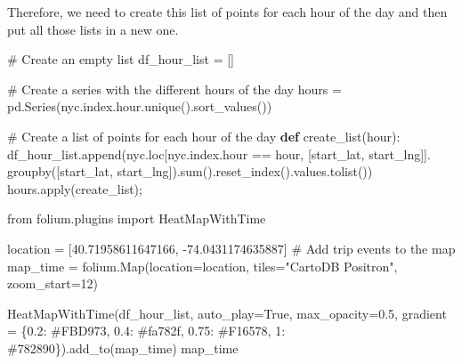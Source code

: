 \documentclass[
  letterpaper,
  DIV=11,
  numbers=noendperiod]{scrreprt}
\newenvironment{Shaded}{\begin{snugshade}}{\end{snugshade}}
\newcommand{\BuiltInTok}[1]{\textcolor[rgb]{0.00,0.23,0.31}{#1}}
\newcommand{\CommentTok}[1]{\textcolor[rgb]{0.37,0.37,0.37}{#1}}
\newcommand{\DecValTok}[1]{\textcolor[rgb]{0.68,0.00,0.00}{#1}}
\newcommand{\FloatTok}[1]{\textcolor[rgb]{0.68,0.00,0.00}{#1}}
\newcommand{\ImportTok}[1]{\textcolor[rgb]{0.00,0.46,0.62}{#1}}
\newcommand{\KeywordTok}[1]{\textcolor[rgb]{0.00,0.23,0.31}{\textbf{#1}}}
\newcommand{\NormalTok}[1]{\textcolor[rgb]{0.00,0.23,0.31}{#1}}
\newcommand{\OperatorTok}[1]{\textcolor[rgb]{0.37,0.37,0.37}{#1}}
\newcommand{\StringTok}[1]{\textcolor[rgb]{0.13,0.47,0.30}{#1}}
\newcommand{\VariableTok}[1]{\textcolor[rgb]{0.07,0.07,0.07}{#1}}
\begin{document}
Therefore, we need to create this list of points for each hour of the
day and then put all those lists in a new one.

\begin{Shaded}
\begin{Highlighting}[]
\CommentTok{\# Create an empty list}
\NormalTok{df\_hour\_list }\OperatorTok{=}\NormalTok{ []}

\CommentTok{\# Create a series with the different hours of the day}
\NormalTok{hours }\OperatorTok{=}\NormalTok{ pd.Series(nyc.index.hour.unique().sort\_values())}

\CommentTok{\# Create a list of points for each hour of the day}
\KeywordTok{def}\NormalTok{ create\_list(hour):}
\NormalTok{    df\_hour\_list.append(nyc.loc[nyc.index.hour }\OperatorTok{==}\NormalTok{ hour,}
\NormalTok{                                [}\StringTok{\textquotesingle{}start\_lat\textquotesingle{}}\NormalTok{,}
                                 \StringTok{\textquotesingle{}start\_lng\textquotesingle{}}\NormalTok{]].}
\NormalTok{                        groupby([}\StringTok{\textquotesingle{}start\_lat\textquotesingle{}}\NormalTok{, }
                                 \StringTok{\textquotesingle{}start\_lng\textquotesingle{}}\NormalTok{]).}\BuiltInTok{sum}\NormalTok{().reset\_index().values.tolist())}
\NormalTok{hours.}\BuiltInTok{apply}\NormalTok{(create\_list)}\OperatorTok{;}
\end{Highlighting}
\end{Shaded}

\begin{Shaded}
\begin{Highlighting}[]
\ImportTok{from}\NormalTok{ folium.plugins }\ImportTok{import}\NormalTok{ HeatMapWithTime}

\NormalTok{location }\OperatorTok{=}\NormalTok{ [}\FloatTok{40.71958611647166}\NormalTok{, }\OperatorTok{{-}}\FloatTok{74.0431174635887}\NormalTok{]}
\CommentTok{\# Add trip events to the map}
\NormalTok{map\_time }\OperatorTok{=}\NormalTok{ folium.Map(location}\OperatorTok{=}\NormalTok{location, }
\NormalTok{                      tiles}\OperatorTok{=}\StringTok{"CartoDB Positron"}\NormalTok{, }
\NormalTok{                      zoom\_start}\OperatorTok{=}\DecValTok{12}\NormalTok{)}

\NormalTok{HeatMapWithTime(df\_hour\_list, }
\NormalTok{                auto\_play}\OperatorTok{=}\VariableTok{True}\NormalTok{, }
\NormalTok{                max\_opacity}\OperatorTok{=}\FloatTok{0.5}\NormalTok{, }
\NormalTok{                gradient }\OperatorTok{=}\NormalTok{ \{}\FloatTok{0.2}\NormalTok{: }\StringTok{\textquotesingle{}\#FBD973\textquotesingle{}}\NormalTok{, }
                            \FloatTok{0.4}\NormalTok{: }\StringTok{\textquotesingle{}\#fa782f\textquotesingle{}}\NormalTok{, }
                            \FloatTok{0.75}\NormalTok{: }\StringTok{\textquotesingle{}\#F16578\textquotesingle{}}\NormalTok{, }
                            \DecValTok{1}\NormalTok{: }\StringTok{\textquotesingle{}\#782890\textquotesingle{}}\NormalTok{\}).add\_to(map\_time)}
\NormalTok{map\_time}
\end{Highlighting}
\end{Shaded}
\end{document}
